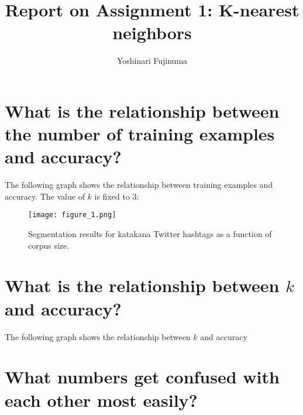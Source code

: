 \documentclass[11pt]{article}
\begin{document}
\title{Report on Assignment 1: K-nearest neighbors}
\author{Yoshinari Fujinuma}
\maketitle

\section{What is the relationship between the number of training examples and accuracy?}
The following graph shows the relationship between training examples and accuracy. The value of $k$ is fixed to $3$:
\begin{figure}[htb]
   \begin{center}
    \scalebox{0.5}
     {\texttt{[image: figure\_1.png]}}
    \end{center}
    \caption{Segmentation results for katakana Twitter hashtags as a function of corpus size.}
    \label{fig:corpus_size}
\end{figure}
\section{What is the relationship between $k$ and accuracy?}
The following graph shows the relationship between $k$ and accuracy
\section{What numbers get confused with each other most easily?}
\end{document}
